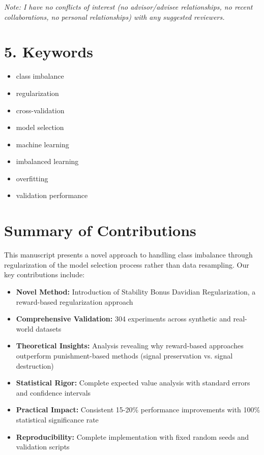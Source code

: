 \documentclass[11pt]{article}
\begin{document}
\textit{Note: I have no conflicts of interest (no advisor/advisee relationships, no recent collaborations, no personal relationships) with any suggested reviewers.}

\section*{5. Keywords}

\begin{itemize}
\item class imbalance
\item regularization
\item cross-validation
\item model selection
\item machine learning
\item imbalanced learning
\item overfitting
\item validation performance
\end{itemize}

\section*{Summary of Contributions}

This manuscript presents a novel approach to handling class imbalance through regularization of the model selection process rather than data resampling. Our key contributions include:

\begin{itemize}
\item \textbf{Novel Method:} Introduction of Stability Bonus Davidian Regularization, a reward-based regularization approach
\item \textbf{Comprehensive Validation:} 304 experiments across synthetic and real-world datasets
\item \textbf{Theoretical Insights:} Analysis revealing why reward-based approaches outperform punishment-based methods (signal preservation vs. signal destruction)
\item \textbf{Statistical Rigor:} Complete expected value analysis with standard errors and confidence intervals
\item \textbf{Practical Impact:} Consistent 15-20\% performance improvements with 100\% statistical significance rate
\item \textbf{Reproducibility:} Complete implementation with fixed random seeds and validation scripts
\end{itemize}
\end{document}
